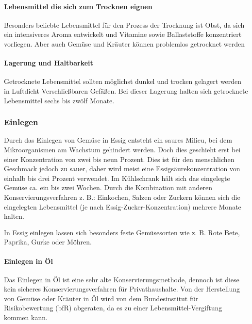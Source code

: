 \paragraph{Lebensmittel die sich zum Trocknen eignen}
Besonders beliebte Lebensmittel für den Prozess der Trocknung ist Obst, da sich ein intensiveres Aroma entwickelt und Vitamine sowie Ballaststoffe konzentriert vorliegen. Aber auch Gemüse und Kräuter können problemlos getrocknet werden %

\paragraph{Lagerung und Haltbarkeit}
Getrocknete Lebensmittel sollten möglichst dunkel und trocken gelagert werden in Luftdicht Verschließbaren Gefäßen. Bei dieser Lagerung halten sich getrocknete Lebensmittel sechs bis zwölf Monate. %

\subsubsection{Einlegen}
Durch das Einlegen von Gemüse in Essig entsteht ein saures Milieu, bei dem Mikroorganismen am Wachstum gehindert werden. Doch dies geschieht erst bei einer Konzentration von zwei bis neun Prozent. Dies ist für den menschlichen Geschmack jedoch zu sauer, daher wird meist eine Essigsäurekonzentration von einhalb bis drei Prozent verwendet. %
Im Kühlschrank hält sich das eingelegte Gemüse ca. ein bis zwei Wochen. Durch die Kombination mit anderen Konservierungsverfahren z. B.: Einkochen, Salzen oder Zuckern können sich die eingelegten Lebensmittel (je nach Essig-Zucker-Konzentration) mehrere Monate halten. %

In Essig einlegen lassen sich besonders feste Gemüsesorten wie z. B. Rote Bete, Paprika, Gurke oder Möhren.

\paragraph{Einlegen in Öl}
Das Einlegen in Öl ist eine sehr alte Konservierungsmethode, dennoch ist diese kein sicheres Konservierungsverfahren für Privathaushalte. Von der Herstellung von Gemüse oder Kräuter in Öl wird von dem Bundesinstitut für Risikobewertung (bfR) abgeraten, da es zu einer Lebensmittel-Vergiftung kommen kann. %

